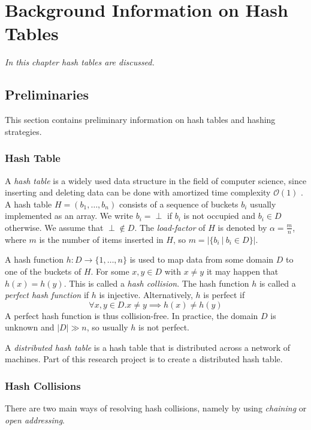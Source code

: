 \chapter{Background Information on Hash Tables}

\textit{In this chapter hash tables are discussed.}

\section{Preliminaries}
This section contains preliminary information on hash tables and hashing strategies.

\subsection{Hash Table}
A \emph{hash table} is a widely used data structure in the field of computer science, since inserting and deleting data can be done with amortized time complexity $\mathcal{O}(1)$ \cite{DBLP:conf/vldb/Litwin80}. A hash table $H = (b_1, \dots, b_n)$ consists of a sequence of buckets $b_i$ usually implemented as an array. We write $b_i = \perp$ if $b_i$ is not occupied and $b_i \in D$ otherwise. We assume that $\perp \not \in D$. The \emph{load-factor} of $H$ is denoted by $\alpha = \frac{m}{n}$, where $m$ is the number of items inserted in $H$, so $m = |\{ b_i \ | \ b_i \in D \}|$.

A hash function $h : D \rightarrow \{ 1, \dots, n \}$ is used to map data from some domain $D$ to one of the buckets of $H$. For some $x,y \in D$ with $x \not = y$ it may happen that $h(x) = h(y)$. This is called a \emph{hash collision}. The hash function $h$ is called a \emph{perfect hash function} if $h$ is injective. Alternatively, $h$ is perfect if $$\forall x, y \in D. x \not = y \implies h(x) \not = h(y)$$ A perfect hash function is thus collision-free. In practice, the domain $D$ is unknown and $|D| \gg n$, so usually $h$ is not perfect. 

A \emph{distributed hash table} is a hash table that is distributed across a network of machines. Part of this research project is to create a distributed hash table.

\subsection{Hash Collisions}
There are two main ways of resolving hash collisions, namely by using \emph{chaining} or \emph{open addressing}. 

